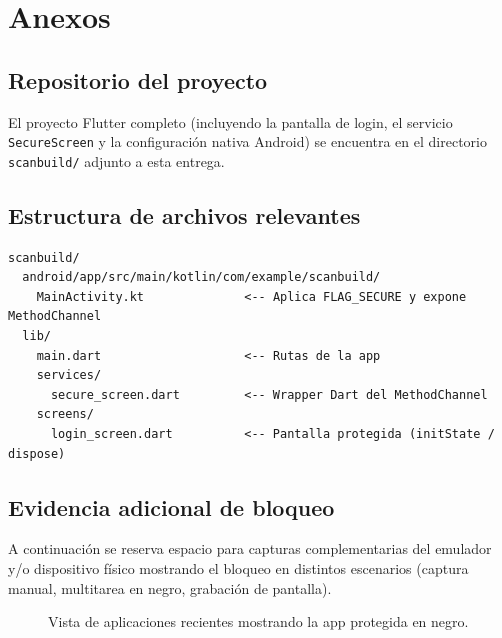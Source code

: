 \documentclass[12pt, a4paper]{article}
\begin{document}
\clearpage

\section{Anexos}
\label{sec:anexos}

\subsection{Repositorio del proyecto}
El proyecto Flutter completo (incluyendo la pantalla de login, el servicio
\texttt{SecureScreen} y la configuración nativa Android) se encuentra en el
directorio \texttt{scanbuild/} adjunto a esta entrega.

\subsection{Estructura de archivos relevantes}

\begin{lstlisting}[language={}, caption={Archivos clave de la solución de seguridad}]
scanbuild/
  android/app/src/main/kotlin/com/example/scanbuild/
    MainActivity.kt              <-- Aplica FLAG_SECURE y expone MethodChannel
  lib/
    main.dart                    <-- Rutas de la app
    services/
      secure_screen.dart         <-- Wrapper Dart del MethodChannel
    screens/
      login_screen.dart          <-- Pantalla protegida (initState / dispose)
\end{lstlisting}

\subsection{Evidencia adicional de bloqueo}
A continuación se reserva espacio para capturas complementarias del emulador
y/o dispositivo físico mostrando el bloqueo en distintos escenarios
(captura manual, multitarea en negro, grabación de pantalla).

\begin{figure}[h]
    \centering
    \caption{Vista de aplicaciones recientes mostrando la app protegida en negro.}
    \label{fig:multitarea}
\end{figure}
\end{document}
